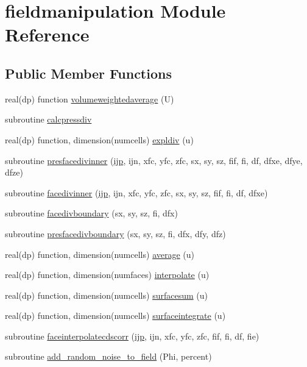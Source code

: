 \hypertarget{classfieldmanipulation}{\section{fieldmanipulation Module Reference}
\label{classfieldmanipulation}
}
\subsection*{Public Member Functions}
\begin{DoxyCompactItemize}
\item 
real(dp) function \hyperlink{classfieldmanipulation_a0bdf9e1dcd8cee01d2a1f90bb96a1583}{volumeweightedaverage} (U)
\item 
subroutine \hyperlink{classfieldmanipulation_ad3594b987621ee1b66dc23373cba6482}{calcpressdiv}
\item 
real(dp) function, dimension(numcells) \hyperlink{classfieldmanipulation_aa58beed06659b15ede41acc5c6249991}{expldiv} (u)
\item 
subroutine \hyperlink{classfieldmanipulation_a8fa4949333251cce2f68dd0566a71e7b}{presfacedivinner} (\hyperlink{CourantNo_8h_accea320a458bb8759c7ece360e05ddf4}{ijp}, ijn, xfc, yfc, zfc, sx, sy, sz, fif, fi, df, dfxe, dfye, dfze)
\item 
subroutine \hyperlink{classfieldmanipulation_afbd4007fedcd5c8960dfc4a3905349a9}{facedivinner} (\hyperlink{CourantNo_8h_accea320a458bb8759c7ece360e05ddf4}{ijp}, ijn, xfc, yfc, zfc, sx, sy, sz, fif, fi, df, dfxe)
\item 
subroutine \hyperlink{classfieldmanipulation_aa28be3da5dcf8b277c6c28391f01a06e}{facedivboundary} (sx, sy, sz, fi, dfx)
\item 
subroutine \hyperlink{classfieldmanipulation_afe436887e04bd6717076c2bee1210f19}{presfacedivboundary} (sx, sy, sz, fi, dfx, dfy, dfz)
\item 
real(dp) function, dimension(numcells) \hyperlink{classfieldmanipulation_a8527c697c24116df3c60fce525a2c364}{average} (u)
\item 
real(dp) function, dimension(numfaces) \hyperlink{classfieldmanipulation_abe2f38fcc53d73b51061465e3cf9e3dd}{interpolate} (u)
\item 
real(dp) function, dimension(numcells) \hyperlink{classfieldmanipulation_a3f3fb8bda2659dd1f034ef8c5a99b405}{surfacesum} (u)
\item 
real(dp) function, dimension(numcells) \hyperlink{classfieldmanipulation_a3212f37b15b79464ad49e662e2a5a394}{surfaceintegrate} (u)
\item 
subroutine \hyperlink{classfieldmanipulation_aba8cce868dfdd1d679c48022ed786ea8}{faceinterpolatecdscorr} (\hyperlink{CourantNo_8h_accea320a458bb8759c7ece360e05ddf4}{ijp}, ijn, xfc, yfc, zfc, fif, fi, df, fie)
\item 
subroutine \hyperlink{classfieldmanipulation_a3e8ca2ca22fb46938f8a479a82c90205}{add\-\_\-random\-\_\-noise\-\_\-to\-\_\-field} (Phi, percent)
\end{DoxyCompactItemize}


